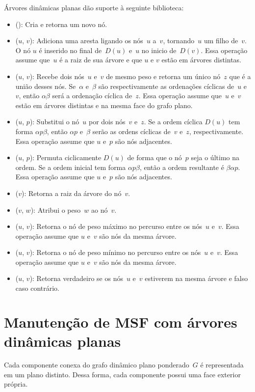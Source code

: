 Árvores dinâmicas planas dão suporte à seguinte biblioteca:
\begin{itemize}
\item \LCOMakeNode(): Cria e retorna um novo nó.
\item \LCOLink($u$, $v$): Adiciona uma aresta ligando os nós~$u$ a~$v$, tornando~$u$ um filho de~$v$.
O nó $u$ é inserido no final de~$D(u)$ e~$u$ no inicio de~$D(v)$.
Essa operação assume que~$u$ é a raiz de sua árvore e que $u$ e $v$ estão em árvores distintas.
\item \LCOMerge($u$, $v$): Recebe dois nós~$u$ e~$v$ de mesmo peso e retorna um único nó~$z$ que é a união desses nós.
Se~$\alpha$ e~$\beta$ são respectivamente as ordenações cíclicas de~$u$ e~$v$, então $\alpha\beta$ será a ordenação cíclica de~$z$.
Essa operação assume que~$u$ e~$v$ estão em árvores distintas e na mesma face do grafo plano.
\item \LCOSplit($u$, $p$): Substitui o nó~$u$ por dois nós~$v$ e~$z$.
Se a ordem cíclica $D(u)$ tem forma $\alpha p\beta$, então $\alpha p$ e~$\beta$ serão as ordens cíclicas de~$v$ e~$z$, respectivamente.
Essa operação assume que $u$ e~$p$ são nós adjacentes.
\item \LCOCycle($u$, $p$): Permuta ciclicamente $D(u)$ de forma que o nó~$p$ seja o último na ordem.
Se a ordem inicial tem forma $\alpha p \beta$, então a ordem resultante é $\beta\alpha p$.
Essa operação assume que $u$ e~$p$ são nós adjacentes.
\item \LCORoot($v$): Retorna a raiz da árvore do nó~$v$.
\item \LCOAddCost($v$, $w$): Atribui o peso~$w$ ao nó~$v$.
\item \LCOMax($u$, $v$): Retorna o nó de peso máximo no percurso entre os nós~$u$ e~$v$.
Essa operação assume que $u$ e~$v$ são nós da mesma árvore.
\item \LCOMin($u$, $v$): Retorna o nó de peso mínimo no percurso entre os nós~$u$ e~$v$.
Essa operação assume que $u$ e~$v$ são nós da mesma árvore.
\item \LCOConnected($u$, $v$): Retorna verdadeiro se os nós~$u$ e~$v$ estiverem na mesma árvore e falso caso contrário.
\end{itemize}


\section{Manutenção de MSF com árvores dinâmicas planas}

Cada componente conexa do grafo dinâmico plano ponderado~$G$ é representada em um plano distinto.
Dessa forma, cada componente possui uma face exterior própria.

